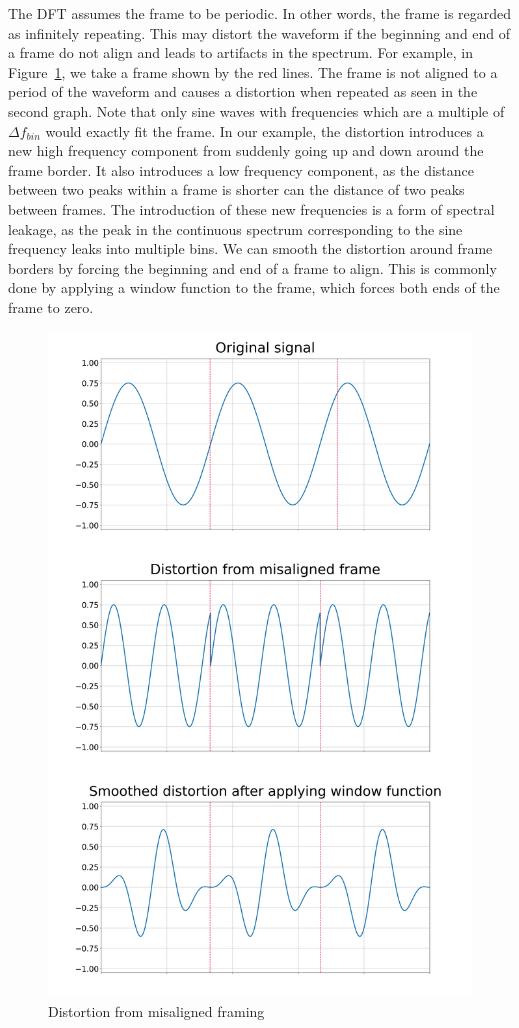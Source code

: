 \documentclass[10pt,twocolumn]{article}
\begin{document}
The DFT assumes the frame to be periodic. In other words, the frame is regarded as infinitely repeating. This may distort the waveform if the beginning and end of a frame do not align and leads to artifacts in the spectrum. For example, in Figure~\ref{fig:framedistortion}, we take a frame shown by the red lines. The frame is not aligned to a period of the waveform and causes a distortion when repeated as seen in the second graph. Note that only sine waves with frequencies which are a multiple of $\Delta f_{bin}$ would exactly fit the frame. In our example, the distortion introduces a new high frequency component from suddenly going up and down around the frame border. It also introduces a low frequency component, as the distance between two peaks within a frame is shorter can the distance of two peaks between frames. The introduction of these new frequencies is a form of spectral leakage, as the peak in the continuous spectrum corresponding to the sine frequency leaks into multiple bins. We can smooth the distortion around frame borders by forcing the beginning and end of a frame to align. This is commonly done by applying a window function to the frame, which forces both ends of the frame to zero.
\begin{figure}[H]
    \centering
    \includegraphics[width=\linewidth]{fig/framedistortion.png}
    \caption{Distortion from misaligned framing}
    \label{fig:framedistortion}
\end{figure}
\end{document}
